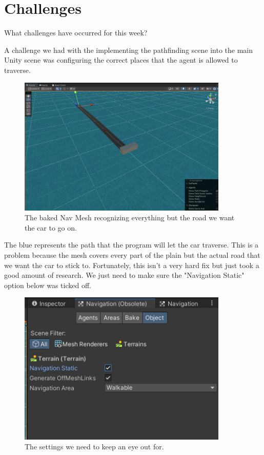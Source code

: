\section{Challenges}

What challenges have occurred for this week?

A challenge we had with the implementing the pathfinding scene into the main Unity scene was configuring the correct places that the agent is allowed to traverse. 

\begin{figure}[htb]
    \centering
    \includegraphics[width=10cm]{../Images/Update3/WrongMesh.png}
       \caption{The baked Nav Mesh recognizing everything but the road we want the car to go on.}
           \label{Fig:Wrong Path}
  \end{figure}

\begin{flushleft}
The blue represents the path that the program will let the car traverse. This is a problem because the mesh covers every part of the plain but the actual road that we want the car to stick to. Fortunately, this isn't a very hard fix but just took a good amount of research. We just need to make sure the "Navigation Static" option below was ticked off.
\end{flushleft}

\begin{figure}[!ht]
    \centering
    \includegraphics[width=10cm]{../Images/Update3/MeshSetting.png}
       \caption{The settings we need to keep an eye out for.}
           \label{Fig: Bake Mesh Settings}
   \end{figure}

